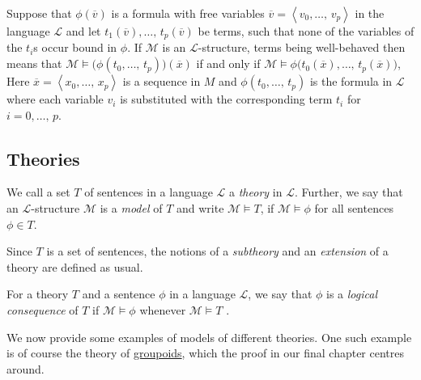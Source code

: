\documentclass[../../main.tex]{subfiles}
\begin{document}
Suppose that $\phi(\overline{v})$ is a formula with free variables $\overline{v} = \left<v_0,\ldots,\, v_p\right>$ in the language $\mathcal{L}$ and let $t_1(\overline{v}),\ldots,\, t_p(\overline{v})$ be terms, 
such that none of the variables of the $t_i$s occur bound in $\phi$.
If $\mathcal{M}$ is an $\mathcal{L}$-structure,
terms being well-behaved then means that $\mathcal{M} \models \big(\phi(t_0,\ldots,\, t_p)\big)(\overline{x})$ if and only if $\mathcal{M} \models  \phi\big(t_0(\overline{x}) ,\ldots,\, t_p(\overline{x})\big)$,
Here $\overline{x} = \left<x_0,\ldots,\, x_p\right>$ is a sequence in $M$ and $\phi(t_0,\ldots,\, t_p)$ is the formula in $\mathcal{L}$ where each variable $v_i$ is substituted with the corresponding term $t_i$ for $i = 0,\ldots,\, p$.

\subsection{Theories}
\begin{definition}[Theory]\cite[\S.1.2]{Mar02}\cite[\S 1.4]{Cha90}
    We call a set $T$ of sentences in a language $\mathcal{L}$ a \emph{theory} in $\mathcal{L}$.
    Further, we say that an $\mathcal{L}$-structure $\mathcal{M}$ is a \emph{model} of $T$ and write $\mathcal{M} \models T$,
    if $\mathcal{M} \models \phi$ for all sentences $\phi \in T$.

    Since $T$ is a set of sentences, the notions of a \emph{subtheory} and an \emph{extension} of a theory are defined as usual.
\end{definition}
For a theory $T$ and a sentence $\phi$ in a language $\mathcal{L}$,
we say that $\phi$ is a \emph{logical consequence} of $T$ if $\mathcal{M} \models \phi$ whenever $\mathcal{M} \models T$ \cite[Definition 1.2.12]{Mar02}.

We now provide some examples of models of different theories.
One such example is of course the theory of \hyperref[groupoid-def]{groupoids}, which the proof in our final chapter centres around.
\end{document}
